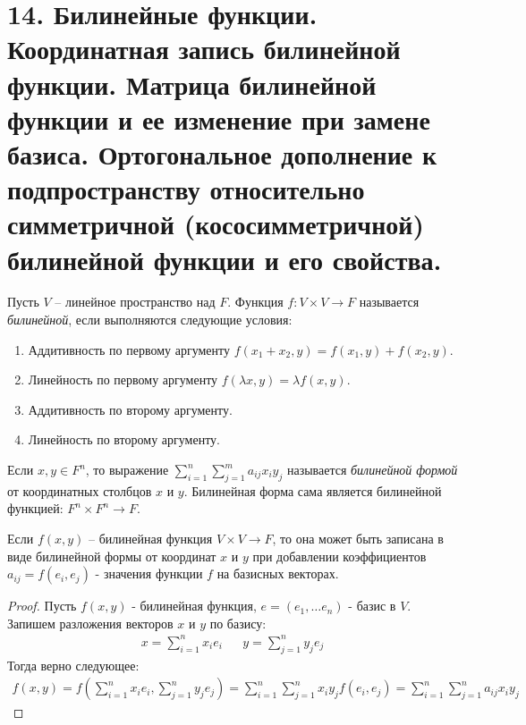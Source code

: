 \section{14. Билинейные функции. Координатная запись билинейной функции. Матрица билинейной функции и ее изменение при замене базиса. Ортогональное дополнение к подпространству относительно симметричной (кососимметричной) билинейной функции и его свойства.}

\begin{definition}
    Пусть $V$ -- линейное пространство над $F$. Функция $f: V \times V \to F$ называется \textit{билинейной}, если выполняются следующие условия:
    \begin{enumerate}
        \item Аддитивность по первому аргументу $f(x_1 + x_2, y) = f(x_1, y) + f(x_2, y)$.
        \item Линейность по первому аргументу $f(\lambda x, y) = \lambda f(x, y)$.
        \item Аддитивность по второму аргументу.
        \item Линейность по второму аргументу.
    \end{enumerate}
\end{definition}

\begin{definition}
    Если $x, y \in F^n$, то выражение $\displaystyle\sum_{i=1}^{n} \displaystyle\sum_{j=1}^{m} a_{ij} x_i y_j$ называется \textit{билинейной формой} от координатных столбцов $x$ и $y$. Билинейная форма сама является билинейной функцией: $F^n \times F^n \to F$.
\end{definition}

\begin{proposition}
    Если $f(x, y)$ -- билинейная функция $V \times V \to F$, то она может быть записана в виде билинейной формы от координат $x$ и $y$ при добавлении коэффициентов $a_{ij} = f(e_i, e_j)$ - значения функции $f$ на базисных векторах. 
\end{proposition}

\begin{proof}
    Пусть $f(x, y)$ - билинейная функция, $e = (e_1, \dots e_n)$ - базис в $V$. Запишем разложения векторов $x$ и $y$ по базису:
    \begin{align*}
        x = \sum_{i=1}^{n} x_i e_i && y = \sum_{j=1}^{n} y_j e_j
    \end{align*}
    Тогда верно следующее:
    \begin{gather*}
        f(x, y) = f(\sum_{i=1}^{n} x_i e_i, \sum_{j=1}^{n} y_j e_j) = \sum_{i=1}^{n} \sum_{j=1}^{n} x_i y_j f(e_i, e_j) = \sum_{i=1}^{n} \sum_{j=1}^{n} a_{ij} x_i y_j
    \end{gather*}
\end{proof}

